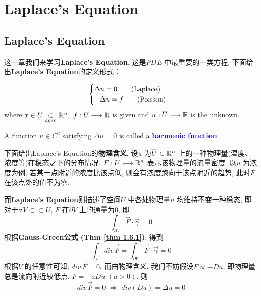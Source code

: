 \ifx\allfiles\undefined


	\else
	\fi
\chapter{Laplace's Equation}
\section{Laplace's Equation}
	这一章我们来学习\textbf{Laplace's Equation}, 这是$PDE$ 中最重要的一类方程. 下面给出\textbf{Laplace's Equation}的定义形式：
	
	\begin{align}
		\begin{cases}
			\Delta u = 0 \hspace*{2em} (\text{Laplace}) \\
			-\Delta u = f \hspace*{2em} (\text{Poisson})
		\end{cases}
	\end{align}
	where $x \in U \underset{open}{\subset} \mathbb{R}^n , \,\, f : U \longrightarrow \mathbb{R}$ is given and $u : \overline{U} \longrightarrow \mathbb{R}$ is the unknown. 
	
	\begin{defn}\label{def 2.1.1}
		A function $u \in C^2$ satisfying $\Delta u = 0$ is called a \underline{\textcolor{blue}{\textbf{harmonic function}}}.
	\end{defn}

	\vspace{4em}
	
	下面给出Laplace's Equation的\textbf{物理含义}. 设$u$ 为$\overline{U} \subset \mathbb{R}^n$ 上的一种物理量(温度、浓度等)在稳态之下的分布情况. $F : U \longrightarrow \mathbb{R}^n$ 表示该物理量的流量密度. 以$u$ 为浓度为例, 若某一点附近的浓度比该点低, 则会有浓度跑向于该点附近的趋势, 此时$F$ 在该点处的值不为零.
	
	\vspace{1em}
	
	而\textbf{Laplace's Equation}则描述了空间$U$ 中各处物理量$u$ 均维持不变一种稳态, 即对于$\forall V \subset \subset U$, $F$ 在$\partial V$ 上的通量为0, 即
	\[ \int_{\partial V} \vec{F} \cdot \vec{\gamma} = 0 \]
	根据\textbf{Gauss-Green公式 (Thm \ref{thm 1.6.1})}, 得到
	\[ \int_{V} div \, \vec{F} = \int_{\partial V} \vec{F} \cdot \vec{\gamma} = 0 \]
	根据$V$ 的任意性可知, $div \, \vec{F} = 0$. 而由物理含义, 我们不妨假设$F \propto -Du$, 即物理量总是流向附近较低点, $F = -a Du \,\, (a > 0)$. 则
	\[ div \, \vec{F} = 0 \,\, \Rightarrow \,\, div(Du) = \Delta u = 0 \]
	
